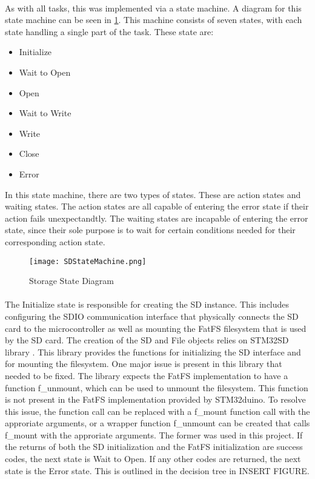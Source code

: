 \paragraph{}
As with all tasks, this was implemented via a state machine.
A diagram for this state machine can be seen in \cref{fig:StorageDiagram}.
This machine consists of seven states, with each state handling a single part of the task.
These state are:
\begin{itemize}
	\item Initialize
	\item Wait to Open
	\item Open
	\item Wait to Write
	\item Write
	\item Close
	\item Error
\end{itemize}
In this state machine, there are two types of states.
These are action states and waiting states.
The action states are all capable of entering the error state if their action fails unexpectandtly.
The waiting states are incapable of entering the error state, since their sole purpose is to wait for certain conditions needed for their corresponding action state.

\begin{figure}[H]
	\centering
	\texttt{[image: SDStateMachine.png]}
	\caption{Storage State Diagram}
	\label{fig:StorageDiagram}
\end{figure}

\paragraph{}
The Initialize state is responsible for creating the SD instance.
This includes configuring the SDIO communication interface that physically connects the SD card to the microcontroller as well as mounting the FatFS filesystem that is used by the SD card.
The creation of the SD and File objects relies on STM32SD library \cite{STM32SDGithub}.
This library provides the functions for initializing the SD interface and for mounting the filesystem.
One major issue is present in this library that needed to be fixed.
The library expects the FatFS implementation to have a function f\_unmount, which can be used to unmount the filesystem.
This function is not present in the FatFS implementation provided by STM32duino.
To resolve this issue, the function call can be replaced with a f\_mount function call with the approriate arguments, or a wrapper function f\_unmount can be created that calls f\_mount with the approriate arguments.
The former was used in this project.
If the returns of both the SD initialization and the FatFS initialization are success codes, the next state is Wait to Open.
If any other codes are returned, the next state is the Error state.
This is outlined in the decision tree in INSERT FIGURE.

